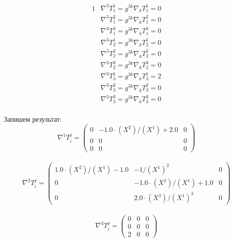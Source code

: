 \documentclass{article}
\begin{document}
\begin{alignat*}{1}
  & \nabla^3T^1_1 = g^{3k}\nabla_kT^1_1 = 0 \\
  & \nabla^3T^2_1 = g^{3k}\nabla_kT^2_1 = 0 \\
  & \nabla^3T^3_1 = g^{3k}\nabla_kT^3_1 = 0 \\
  & \nabla^3T^1_2 = g^{3k}\nabla_kT^1_2 = 0 \\
  & \nabla^3T^2_2 = g^{3k}\nabla_kT^2_2 = 0 \\
  & \nabla^3T^3_2 = g^{3k}\nabla_kT^3_2 = 0 \\
  & \nabla^3T^1_3 = g^{3k}\nabla_kT^1_3 = 2 \\
  & \nabla^3T^2_3 = g^{3k}\nabla_kT^2_3 = 0 \\
  & \nabla^3T^3_3 = g^{3k}\nabla_kT^3_3 = 0 
\end{alignat*}\\
Запишем результат:\\
\[
\nabla^1T^j_i = \begin{pmatrix}
	0 & -1.0\cdot (X^2)/(X^1) + 2.0 & 0\\
	0 & 0 & 0\\
	0 & 0 & 0
\end{pmatrix}
\]\\
\[
\nabla^2T^j_i = \begin{pmatrix}
	1.0\cdot (X^2)/(X^1) - 1.0 & -1/(X^1)^2 & 0\\
	0 & -1.0\cdot (X^2)/(X^1) + 1.0 & 0\\
	0 & 2.0\cdot (X^3)/(X^1)^3 & 0
\end{pmatrix}
\]\\
\[
\nabla^3T^j_i = \begin{pmatrix}
	0 & 0 & 0\\
	0 & 0 & 0\\
	2 & 0 & 0
\end{pmatrix}
\]\\
\vspace*{-0cm} %
\end{document}

